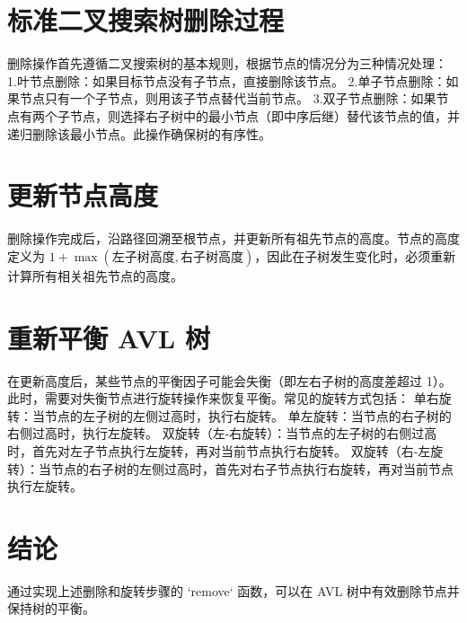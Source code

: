 \documentclass[UTF8]{ctexart}
\begin{document}
\pagestyle{fancy}
\fancyhead{}

\section{标准二叉搜索树删除过程}

删除操作首先遵循二叉搜索树的基本规则，根据节点的情况分为三种情况处理：
   1.叶节点删除：如果目标节点没有子节点，直接删除该节点。
   2.单子节点删除：如果节点只有一个子节点，则用该子节点替代当前节点。
   3.双子节点删除：如果节点有两个子节点，则选择右子树中的最小节点（即中序后继）替代该节点的值，并递归删除该最小节点。此操作确保树的有序性。

\section{更新节点高度}

删除操作完成后，沿路径回溯至根节点，并更新所有祖先节点的高度。节点的高度定义为 $1 + \max(\text{左子树高度}, \text{右子树高度})$，因此在子树发生变化时，必须重新计算所有相关祖先节点的高度。

\section{重新平衡 AVL 树}

在更新高度后，某些节点的平衡因子可能会失衡（即左右子树的高度差超过 1）。此时，需要对失衡节点进行旋转操作来恢复平衡。常见的旋转方式包括：
   单右旋转：当节点的左子树的左侧过高时，执行右旋转。
   单左旋转：当节点的右子树的右侧过高时，执行左旋转。
   双旋转（左-右旋转）：当节点的左子树的右侧过高时，首先对左子节点执行左旋转，再对当前节点执行右旋转。
   双旋转（右-左旋转）：当节点的右子树的左侧过高时，首先对右子节点执行右旋转，再对当前节点执行左旋转。

\section{结论}

通过实现上述删除和旋转步骤的 `remove` 函数，可以在 AVL 树中有效删除节点并保持树的平衡。
\end{document}
